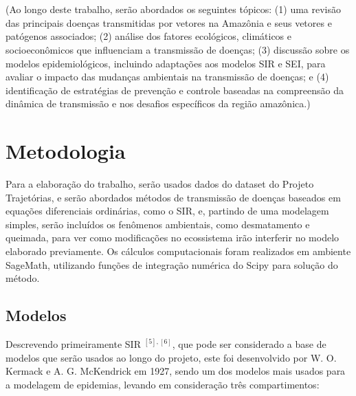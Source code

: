 \documentclass[12pt]{article}
\begin{document}
\\\\
(Ao longo deste trabalho, serão abordados os seguintes tópicos: (1) uma revisão das principais doenças transmitidas por vetores na Amazônia e seus vetores e patógenos associados; (2) análise dos fatores ecológicos, climáticos e socioeconômicos que influenciam a transmissão de doenças; (3) discussão sobre os modelos epidemiológicos, incluindo adaptações aos modelos SIR e SEI, para avaliar o impacto das mudanças ambientais na transmissão de doenças; e (4) identificação de estratégias de prevenção e controle baseadas na compreensão da dinâmica de transmissão e nos desafios específicos da região amazônica.)

\section{Metodologia}

Para a elaboração do trabalho, serão usados dados do dataset do Projeto Trajetórias, e serão abordados métodos de transmissão de doenças baseados em equações diferenciais ordinárias, como o SIR, e, partindo de uma modelagem simples, serão incluídos os fenômenos ambientais, como desmatamento e queimada, para ver como modificações no ecossistema irão interferir no modelo elaborado previamente. Os cálculos computacionais foram realizados em ambiente SageMath, utilizando funções de integração numérica do Scipy para solução do método.

\subsection{Modelos}

Descrevendo primeiramente SIR $^{[5], [6]}$, que pode ser considerado a base de modelos que serão usados ao longo do projeto, este foi desenvolvido por W. O. Kermack e A. G. McKendrick em 1927, sendo um dos modelos mais usados para a modelagem de epidemias, levando em consideração três compartimentos:
\end{document}

